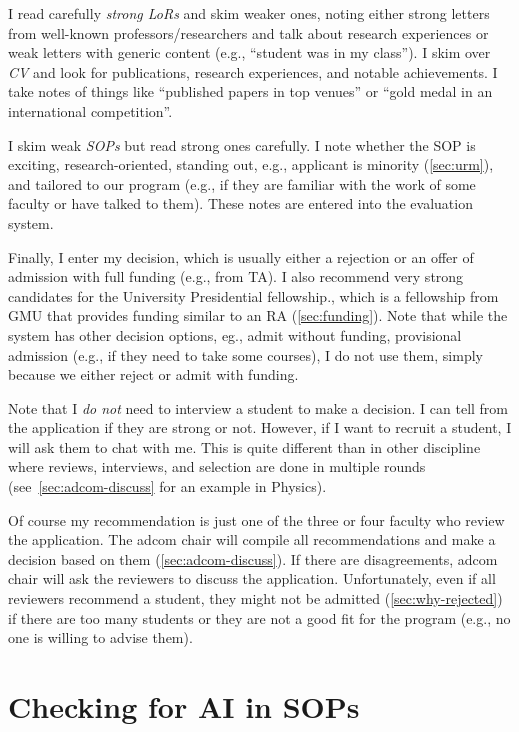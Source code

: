 \documentclass[oneside,11pt,dvipsnames]{book}
\begin{document}
I read carefully \emph{strong LoRs} and skim weaker ones, noting either strong letters from well-known professors/researchers and talk about research experiences or weak letters with generic content (e.g., ``student was in my class''). I skim over \emph{CV} and look for publications, research experiences, and notable achievements. I take notes of things like ``published papers in top venues'' or ``gold medal in an international competition''.

I skim weak \emph{SOPs} but read strong ones carefully. I note whether the SOP is exciting, research-oriented, standing out, e.g., applicant is minority (\autoref{sec:urm}), and tailored to our program (e.g., if they are familiar with the work of some faculty or have talked to them). These notes are entered into the evaluation system.

Finally, I enter my decision, which is usually either a rejection or an offer of admission with full funding (e.g., from TA). I also recommend very strong candidates for the University Presidential fellowship., which is a fellowship from GMU that provides funding similar to an RA (\autoref{sec:funding}).
Note that while the system has other decision options, eg., admit without funding, provisional admission (e.g., if they need to take some courses), I do not use them, simply because we either reject or admit with funding.

Note that I \emph{do not} need to interview a student to make a decision.  I can tell from the application if they are strong or not. However, if I want to recruit a student, I will ask them to chat with me. 
This is quite different than in other discipline where reviews, interviews, and selection are done in multiple rounds (see~\autoref{sec:adcom-discuss} for an example in Physics).

Of course my recommendation is just one of the three or four faculty who review the application.  The adcom chair will compile all recommendations and make a decision based on them (\autoref{sec:adcom-discuss}).
If there are disagreements, adcom chair will ask the reviewers to discuss the application. 
Unfortunately, even if all reviewers recommend a student, they might not be admitted (\autoref{sec:why-rejected}) if there are too many students or they are not a good fit for the program (e.g., no one is willing to advise them).

\section{Checking for AI in SOPs}\label{sec:ai-sop}
\end{document}
